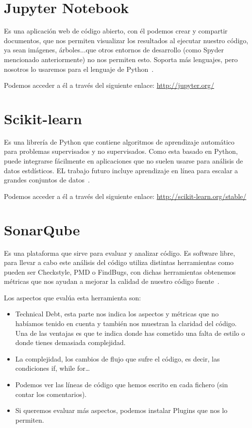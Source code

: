 \section{Jupyter Notebook}
Es una aplicación web de código abierto, con él podemos crear y compartir documentos, que nos permiten visualizar los resultados al ejecutar nuestro código, ya sean imágenes, árboles...que otros entornos de desarrollo (como Spyder mencionado anteriormente) no nos permiten esto.
Soporta más lenguajes, pero nosotros lo usaremos para el lenguaje de Python~\cite{jupyter}.

Podemos acceder a él a través del siguiente enlace: 
\url{http://jupyter.org/}	

\section{Scikit-learn}
Es una librería de Python que contiene algoritmos de aprendizaje automático para problemas supervisados y no supervisados. Como esta basado en Python, puede integrarse fácilmente en aplicaciones que no suelen usarse para análisis de datos estdísticos. EL trabajo futuro incluye aprendizaje en línea para escalar a grandes conjuntos de datos~\cite{scikitlearn}. 

Podemos acceder a él a través del siguiente enlace: 
\url{http://scikit-learn.org/stable/}

\section{SonarQube}
Es una plataforma que sirve para evaluar y analizar código. Es software libre, para llevar a cabo este análisis del código utiliza distintas herramientas como pueden ser Checkstyle, PMD o FindBugs, con dichas herramientas obtenemos métricas que nos ayudan a mejorar la calidad de nuestro código fuente~\cite{wiki:sonarqube}.

Los aspectos que evalúa esta herramienta son:
\begin{itemize}
	\item Technical Debt, esta parte nos indica los aspectos y métricas que no habíamos tenido en cuenta y también nos muestran la claridad del código. Una de las ventajas es que te indica donde has cometido una falta de estilo o donde tienes demasiada complejidad.
	\item La complejidad, los cambios de flujo que sufre el código, es decir, las condiciones if, while for… 
	\item Podemos ver las líneas de código que hemos escrito en cada fichero (sin contar los comentarios).
	\item Si queremos evaluar más aspectos, podemos instalar Plugins que nos lo permiten.
\end{itemize}

